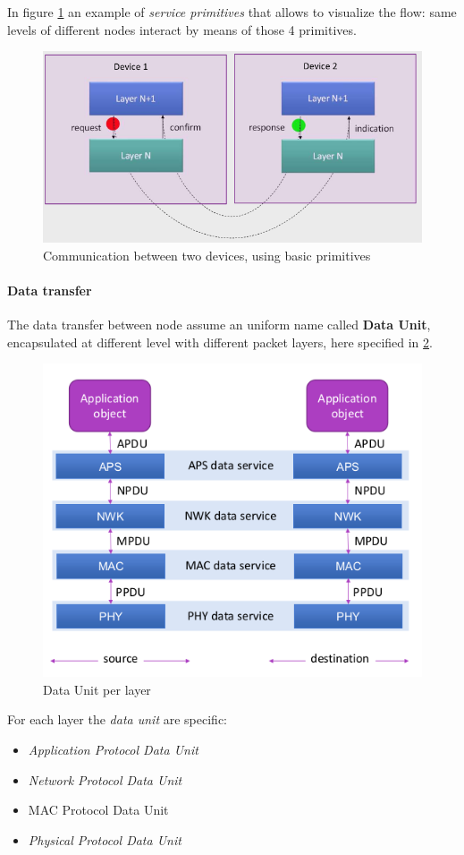 \documentclass[10pt,a4paper]{report}
\theoremstyle{definition}
\begin{document}
In figure \ref{zigbee-com-example} an example of \textit{service primitives} that allows to visualize the flow: same levels of different nodes interact by means of those 4 primitives.
\begin{figure}[h]
	\centering\includegraphics[scale=0.40]{images/Pasted image 20230307163642.png}
	\caption{Communication between two devices, using basic primitives}
\label{zigbee-com-example}
\end{figure}

\paragraph{Data transfer}\label{sec:data-trasnfer}
The data transfer between node assume an uniform name called \textbf{Data Unit}, encapsulated at different level with different packet layers, here specified in \ref{data-unit-layer}.

\begin{figure}[h]
	\centering\includegraphics[scale=0.40]{images/Pasted image 20230307163743.png}
	\caption{Data Unit per layer}
	\label{data-unit-layer}
\end{figure}
For each layer the \textit{data unit} are specific:
\begin{itemize}
	\item 
	\textit{Application Protocol Data Unit}
	\item 
	\textit{Network Protocol Data Unit}
	\item 
	MAC Protocol Data Unit
	\item 
	\textit{Physical Protocol Data Unit}
\end{itemize}
\end{document}
